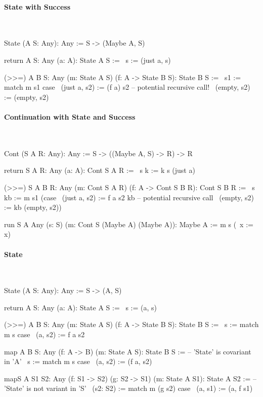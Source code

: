 \paragraph{State with Success}

\ \begin{alba}
    State (A S: Any): Any :=
        S -> (Maybe A, S)

    return {A S: Any} (a: A): State A S :=
        \ s := (just a, s)

    (>>=) {A B S: Any} (m: State A S) (f: A -> State B S): State B S :=
        \ s1 :=
            match m s1 case
                \ (just a, s2) :=  (f a) s2     -- potential recursive call!
                \ (empty,  s2) :=  (empty, s2)
\end{alba}




\paragraph{Continuation with State and Success}

\ \begin{alba}
    Cont (S A R: Any): Any :=
        S -> ((Maybe A, S) -> R) -> R

    return {S A R: Any} (a: A): Cont S A R :=
        \ s k := k s (just a)

    (>>=) {S A B R: Any} (m: Cont S A R) (f: A -> Cont S B R): Cont S B R :=
        \ s kb :=
            m s1
              (case
                \ (just a, s2)  := f a s2 kb        -- potential recursive call
                \ (empty,  s2)  := kb (empty, s2))

    run {S A Any} (s: S) (m: Cont S (Maybe A) (Maybe A)): Maybe A :=
        m s (\ x := x)
\end{alba}







\paragraph{State}

\ \begin{alba}
    State (A S: Any): Any :=
        S -> (A, S)

    return {A S: Any} (a: A): State A S :=
        \ s := (a, s)

    (>>=) {A B S: Any} (m: State A S) (f: A -> State B S): State B S :=
        \ s :=
            match m s case
                \ (a, s2)  := f a s2

    map {A B S: Any} (f: A -> B) (m: State A S): State B S :=
            -- 'State' is covariant in 'A'
        \ s :=
            match m s case
                \ (a, s2) := (f a, s2)

    mapS {A S1 S2: Any} (f: S1 -> S2) (g: S2 -> S1) (m: State A S1): State A S2 :=
            -- 'State' is not variant in 'S'
        \ (s2: S2) :=
            match m (g s2)  case
                \ (a, s1) := (a, f s1)
\end{alba}




